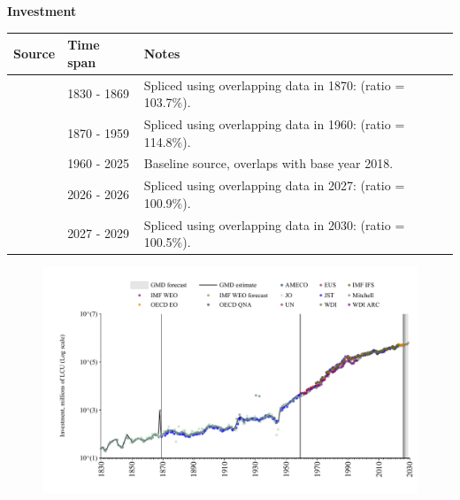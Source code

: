 \documentclass[12pt,a4paper,landscape]{article}
\begin{document}
\begin{adjustbox}{max totalsize={\paperwidth}{\paperheight},center}
\begin{minipage}[t][\textheight][t]{\textwidth}
\vspace*{0.5cm}
{}
\begin{center}
{\Large\bfseries Investment}
\end{center}
\vspace{0.5cm}
\begin{table}[H]
\centering
\small
\begin{tabular}{|l|l|l|}
\hline
\textbf{Source} & \textbf{Time span} & \textbf{Notes} \\
\hline
\rowcolor{white}\cite{Mitchell}& 1830 - 1869 &Spliced using overlapping data in 1870: (ratio = 103.7\%). \\
\rowcolor{lightgray}\cite{JST}& 1870 - 1959 &Spliced using overlapping data in 1960: (ratio = 114.8\%). \\
\rowcolor{white}\cite{OECD_EO}& 1960 - 2025 &Baseline source, overlaps with base year 2018. \\
\rowcolor{lightgray}\cite{AMECO}& 2026 - 2026 &Spliced using overlapping data in 2027: (ratio = 100.9\%). \\
\rowcolor{white}\cite{IMF_WEO_forecast}& 2027 - 2029 &Spliced using overlapping data in 2030: (ratio = 100.5\%). \\
\hline
\end{tabular}
\end{table}
\begin{figure}[H]
\centering
\includegraphics[width=\textwidth,height=0.6\textheight,keepaspectratio]{graphs/GBR_inv.pdf}
\end{figure}
\end{minipage}
\end{adjustbox}
\end{document}

